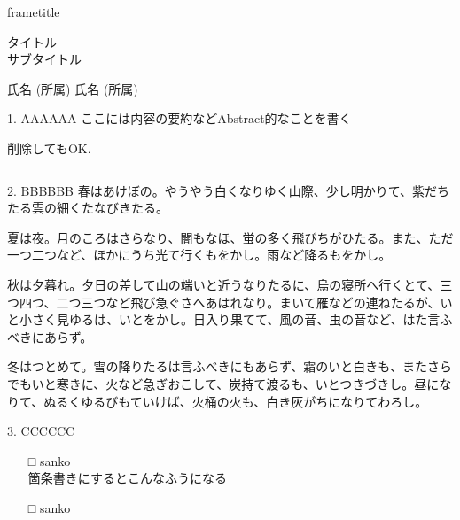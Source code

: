 \documentclass[14pt,dvipdfmx]{beamer}
\begin{document}
  \begin{frame}[t]


    \begin{beamercolorbox}[rounded=true]{frametitle}
      \begin{center}
        {\VeryHuge タイトル}\\
        {\huge サブタイトル}
      \end{center}
    \end{beamercolorbox}

    \begin{center}
      {\Large 氏名 (所属) \hspace{2em} 氏名 (所属) }\\
    \end{center}

    \begin{block}{1. AAAAAA}
      ここには内容の要約などAbstract的なことを書く\par
      削除してもOK.
      \vspace{4cm}
    \end{block}\vspace{-13mm}

    \begin{columns}[t]
      \begin{column}{.48\linewidth}

        \begin{block}{2. BBBBBB}
          春はあけぼの。やうやう白くなりゆく山際、少し明かりて、紫だちたる雲の細くたなびきたる。\par
          夏は夜。月のころはさらなり、闇もなほ、蛍の多く飛びちがひたる。また、ただ一つ二つなど、ほかにうち光て行くもをかし。雨など降るもをかし。 \par
          秋は夕暮れ。夕日の差して山の端いと近うなりたるに、烏の寝所へ行くとて、三つ四つ、二つ三つなど飛び急ぐさへあはれなり。まいて雁などの連ねたるが、いと小さく見ゆるは、いとをかし。日入り果てて、風の音、虫の音など、はた言ふべきにあらず。\par 
          冬はつとめて。雪の降りたるは言ふべきにもあらず、霜のいと白きも、またさらでもいと寒きに、火など急ぎおこして、炭持て渡るも、いとつきづきし。昼になりて、ぬるくゆるびもていけば、火桶の火も、白き灰がちになりてわろし。 
        \end{block}

        \begin{block}{3. CCCCCC}
          \begin{itemize}
            \item[□] sanko\\
            箇条書きにするとこんなふうになる
            \item[□] sanko
          \end{itemize}
        \end{block}


\end{column}
\end{columns}
\end{frame}
\end{document}
